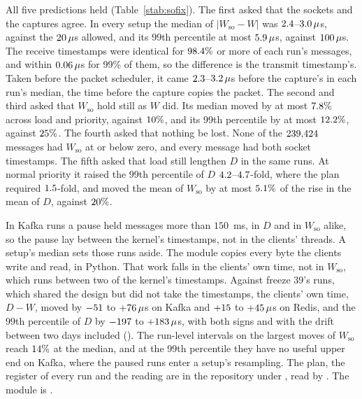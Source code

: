 \documentclass[10pt,journal,onecolumn]{IEEEtran}
\newcommand{\kafka}{Kafka}
\newcommand{\redis}{Redis}
\begin{document}
All five predictions held (Table~\ref{stab:sofix}). The first asked that the sockets and the
captures agree. In every setup the median of $|W_{\mathrm{so}} - W|$ was
$2.4$--$3.0\,\mu$s, against the $20\,\mu$s
allowed, and its 99th percentile at most $5.9\,\mu$s, against
$100\,\mu$s. The receive timestamps were identical for $98.4\%$
or more of each run's messages, and within $0.06\,\mu$s for 99\% of them, so the
difference is the transmit timestamp's. Taken before the packet scheduler, it came
$2.3$--$3.2\,\mu$s before the capture's in each run's median, the
time before the capture copies the packet. The second and third asked that $W_{\mathrm{so}}$ hold
still as $W$ did. Its median moved by at most $7.8\%$ across load and priority,
against $10\%$, and its 99th percentile by at most $12.2\%$,
against $25\%$. The fourth asked that nothing be lost. None of the
$239{,}424$ messages had $W_{\mathrm{so}}$ at or below zero, and every message had both
socket timestamps. The fifth asked that load still lengthen $D$ in the same runs. At normal
priority it raised the 99th percentile of $D$ $4.2$--$4.7$-fold, where
the plan required $1.5$-fold, and moved the mean of $W_{\mathrm{so}}$ by at most
$5.1\%$ of the rise in the mean of $D$, against $20\%$.

In \soFixPausedRunsWord{} \kafka{} runs a pause held messages more than $150$~ms, in $D$ and in
$W_{\mathrm{so}}$ alike, so the pause lay between the kernel's timestamps, not in the clients'
threads. A setup's median sets those runs aside. The module copies every byte the clients write
and read, in Python. That work falls in the clients' own time, not in $W_{\mathrm{so}}$, which runs
between two of the kernel's timestamps. Against freeze 39's runs, which shared the design but did
not take the timestamps, the clients' own time, $D - W$, moved by $-51$ to
$+76\,\mu$s on \kafka{} and $+15$ to $+45\,\mu$s on
\redis{}, and the 99th percentile of $D$ by $-197$ to $+183\,\mu$s, with both
signs and with the drift between two days included ().
The run-level intervals on the largest moves of $W_{\mathrm{so}}$ reach $14\%$
at the median, and at the 99th percentile they have no useful upper end on \kafka{}, where the
paused runs enter a setup's resampling.
The plan, the register of every run and the reading are in
the repository under , read by . The module is
.
\end{document}
